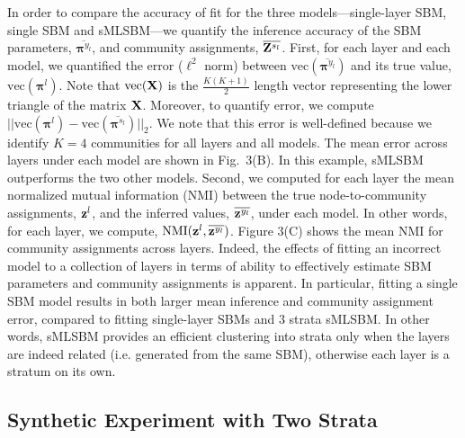 {%
In order to compare the accuracy of fit for the three models---single-layer SBM, single SBM and sMLSBM---we quantify the inference accuracy of the SBM parameters, $\overline{{\boldsymbol \pi}^{y_{l}}}$, and community assignments, $\overline{{\bf Z}^{s_{l}}}$. 
%
First, for each layer and each model, we quantified the error ($\ell^{2}$ norm) between $\text{vec}(\overline{{\boldsymbol \pi}^{y_{l}}})$ and its true value, $\text{vec}({\boldsymbol \pi}^{l})$. Note that $\text{vec}({\bf X})$ is the $\frac{K(K+1)}{2}$ length vector representing the lower triangle of the matrix ${\bf X}$.  Moreover, to quantify error,
we compute $||\mbox{vec}({\boldsymbol \pi^{l}})-\text{vec}(\overline{{\boldsymbol \pi}^{s_{l}}})||_{2}$.  We note that this error is well-defined because we identify $K=4$ communities for all layers and all models. The mean error across layers under each model are shown in Fig.~3(B). In this example, sMLSBM outperforms the two other models.
%
Second, we computed for each layer the mean normalized mutual information (NMI) \cite{commdeccompare} between the true node-to-community assignments, ${\bf z}^{l}$, and the inferred values, $\overline{{\bf z}^{y_{l}}}$, under each model. In other words, for each layer, we compute, $\text{NMI}({\bf z}^{l},\overline{{\bf z}^{y_{l}}})$. Figure 3(C) shows the mean NMI for community assignments across layers. Indeed, the effects of fitting an incorrect model to a collection of layers in terms of ability to effectively estimate SBM parameters and community assignments is apparent. In particular, fitting a single SBM model results in both larger mean inference and community assignment error, compared to fitting single-layer SBMs and 3 strata sMLSBM. In other words, sMLSBM provides an efficient clustering into strata only when the layers are indeed related (i.e. generated from the same SBM), otherwise each layer is a stratum on its own.

\subsection{Synthetic Experiment with Two Strata}\label{sec:2strata}

}
